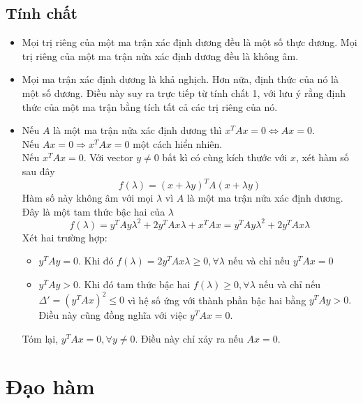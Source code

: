 \documentclass[12pt,a4paper]{report}
\begin{document}
	\subsection{Tính chất}
	\begin{itemize}
		\item Mọi trị riêng của một ma trận xác định dương đều là một số thực dương.  Mọi trị riêng của một ma trận nửa xác định dương đều là không âm.\item Mọi ma trận xác định dương là khả nghịch.  Hơn nữa, định thức của nó là một số dương. Điều này suy ra trực tiếp từ tính chất 1, với lưu ý rằng định thức của một ma trận bằng tích tất cả các trị riêng của nó.
		\item Nếu $A$ là một ma trận nửa xác định dương thì $x^TAx = 0 \Leftrightarrow Ax = 0.$ \\Nếu $Ax = 0 \Rightarrow x^TAx = 0$ một cách hiển nhiên.\\ Nếu $x^TAx = 0$. Với vector $y \neq 0$ bất kì có cùng kích thước với $x$, xét hàm số sau đây $$f(\lambda) = (x+\lambda y)^TA(x+ \lambda y)$$ Hàm số này không âm với mọi $\lambda$ vì $A$ là một ma trận nửa xác định dương. Đây là một tam thức bậc hai của $\lambda$ $$f(\lambda) = y^TAy\lambda^2 + 2y^TAx\lambda + x^TAx = y^TAy\lambda^2 + 2y^TAx\lambda$$ Xét hai trường hợp: 
		\begin{itemize}
			\item $y^TAy = 0$. Khi đó $f(\lambda) = 2y^TAx\lambda \geq 0, \forall \lambda$ nếu và chỉ nếu $y^TAx = 0$
			\item $y^TAy > 0$. Khi đó tam thức bậc hai $f(\lambda) \geq 0, \forall \lambda$ nếu và chỉ nếu $\Delta' = (y^TAx)^2 \leq 0$ vì hệ số ứng với thành phần bậc hai bằng $y^TAy > 0.$ Điều này cũng đồng nghĩa với việc $y^TAx = 0$.
		\end{itemize}
		Tóm lại, $y^TAx = 0, \forall y \neq 0$. Điều này chỉ xảy ra nếu $Ax = 0$.
	\end{itemize}
	\section{Đạo hàm}
\end{document}
